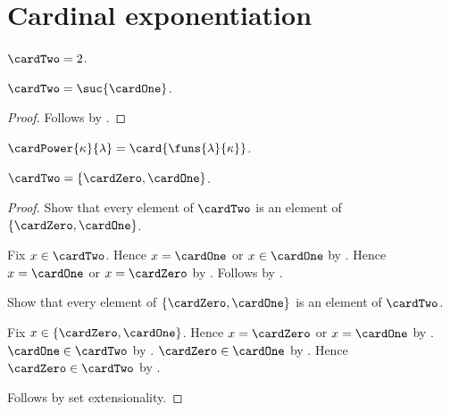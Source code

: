 


\section{Cardinal exponentiation}

\begin{definition}\label{cardinal_two}
    $\cardTwo=2$.
\end{definition}

\begin{proposition}\label{cardinal_two_successor}
    $\cardTwo=\suc{\cardOne}$.
\end{proposition}
\begin{proof}
    Follows by .
\end{proof}

\begin{definition}\label{cardinal_power}
    $\cardPower{\kappa}{\lambda}=\card{\funs{\lambda}{\kappa}}$.
\end{definition}

\begin{proposition}\label{cardinal_two_elements}
    $\cardTwo=\{\cardZero,\cardOne\}$.
\end{proposition}
\begin{proof}
    Show that every element of $\cardTwo$ is an element of
        $\{\cardZero,\cardOne\}$.
    \begin{subproof}
        Fix $x\in\cardTwo$.
        Hence $x=\cardOne$ or $x\in\cardOne$
            by .
        Hence $x=\cardOne$ or $x=\cardZero$
            by
            .
        Follows by .
    \end{subproof}
    Show that every element of $\{\cardZero,\cardOne\}$ is an element of
        $\cardTwo$.
    \begin{subproof}
        Fix $x\in\{\cardZero,\cardOne\}$.
        Hence $x=\cardZero$ or $x=\cardOne$
            by .
        $\cardOne\in\cardTwo$
            by .
        $\cardZero\in\cardOne$
            by
            .
        Hence $\cardZero\in\cardTwo$
            by .
    \end{subproof}
    Follows by set extensionality.
\end{proof}

